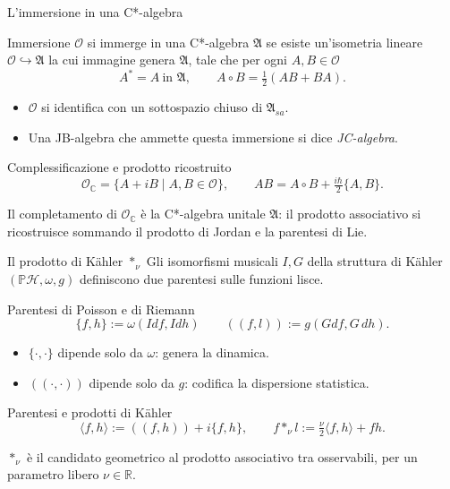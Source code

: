 \documentclass[aspectratio=169,11pt]{beamer}
\begin{document}
\begin{frame}{L'immersione in una C*-algebra}
	\begin{block}{Immersione}
		$\mathcal O$ si immerge in una C*-algebra $\mathfrak{A}$ se esiste un'isometria lineare $\mathcal O \hookrightarrow \mathfrak{A}$ la cui immagine genera $\mathfrak{A}$, tale che per ogni $A,B\in\mathcal O$
		\[
		A^*=A \ \text{in } \mathfrak{A}, \qquad A\circ B = \tfrac12(AB+BA).
		\]
	\end{block}
	\begin{itemize}
		\item $\mathcal O$ si identifica con un sottospazio chiuso di $\mathfrak{A}_{sa}$.
		\item Una JB-algebra che ammette questa immersione si dice \emph{JC-algebra}.
	\end{itemize}
	
	\begin{block}{Complessificazione e prodotto ricostruito}
		\[
		\mathcal O_{\mathbb C} = \{A+iB \mid A,B\in\mathcal O\}, \qquad AB = A\circ B + \tfrac{i\hbar}{2}\{A,B\}.
		\]
	\end{block}
	Il completamento di $\mathcal O_{\mathbb C}$ è la C*-algebra unitale $\mathfrak{A}$: il prodotto associativo si ricostruisce sommando il prodotto di Jordan e la parentesi di Lie.
\end{frame}


\begin{frame}{Il prodotto di Kähler $*_\nu$}
	Gli isomorfismi musicali $I,G$ della struttura di Kähler $(\mathbb{P} \mathcal{H},\omega,g)$ definiscono due parentesi sulle funzioni lisce.
	\begin{block}{Parentesi di Poisson e di Riemann}
		\[
		\{f,h\} := \omega(I df, I dh) \qquad (\!( f,l )\!) := g( Gdf, G\,dh).
		\]
	\end{block}
	\begin{itemize}
		\item $\{\cdot,\cdot\}$ dipende solo da $\omega$: genera la dinamica.
		\item $(\!(\cdot,\cdot)\!)$ dipende solo da $g$: codifica la dispersione statistica.
	\end{itemize}
	\begin{block}{Parentesi e prodotti di Kähler}
		\[
		\langle f,h\rangle := (\!( f,h )\!) + i\{f,h\}, \qquad f *_\nu l := \tfrac{\nu}{2}\langle f,h\rangle + fh.
		\]
	\end{block}
	$*_\nu$ è il candidato geometrico al prodotto associativo tra osservabili, per un parametro libero $\nu\in\mathbb R$.
\end{frame}
\end{document}
